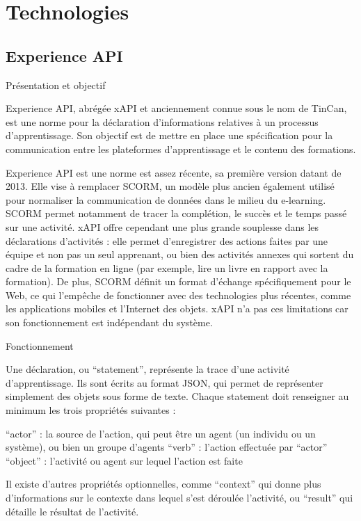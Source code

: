 \chapter{Technologies}

    \section{Experience API  }

Présentation et objectif

Experience API, abrégée xAPI et anciennement connue sous le nom de TinCan, est une norme pour la déclaration d’informations relatives à un processus d’apprentissage. Son objectif est de mettre en place une spécification pour la communication entre les plateformes d’apprentissage et le contenu des formations.

Experience API est une norme est assez récente, sa première version datant de 2013. Elle vise à remplacer SCORM, un modèle plus ancien également utilisé pour normaliser la communication de données dans le milieu du e-learning. SCORM permet notamment de tracer la complétion, le succès et le temps passé sur une activité.
xAPI offre cependant une plus grande souplesse dans les déclarations d’activités : elle permet d’enregistrer des actions faites par une équipe et non pas un seul apprenant, ou bien des activités annexes qui sortent du cadre de la formation en ligne (par exemple, lire un livre en rapport avec la formation). 
De plus, SCORM définit un format d’échange spécifiquement pour le Web, ce qui l’empêche de fonctionner avec des technologies plus récentes, comme les applications mobiles et l’Internet des objets. xAPI n’a pas ces limitations car son fonctionnement est indépendant du système.

Fonctionnement

Une déclaration, ou “statement”, représente la trace d’une activité d’apprentissage. Ils sont écrits au format JSON, qui permet de représenter simplement des objets sous forme de texte. Chaque statement doit renseigner au minimum les trois propriétés suivantes :

“actor” : la source de l’action, qui peut être un agent (un individu ou un système), ou bien un groupe d’agents
“verb” : l’action effectuée par “actor”
“object” : l’activité ou agent sur lequel l’action est faite

Il existe d’autres propriétés optionnelles, comme “context” qui donne plus d’informations sur le contexte dans lequel s’est déroulée l’activité, ou “result” qui détaille le résultat de l’activité.

